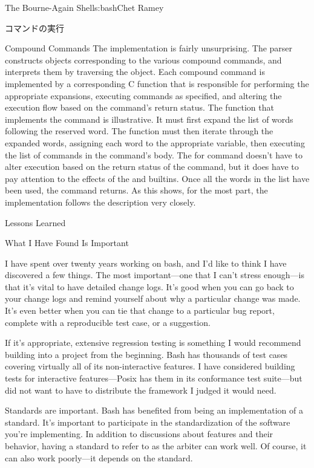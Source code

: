 \begin{aosachapter}{The Bourne-Again Shell}{s:bash}{Chet Ramey}
\begin{aosasect1}{コマンドの実行}
\begin{aosasect2}{Compound Commands}
The implementation is fairly unsurprising.  The parser constructs
objects corresponding to the various compound commands, and interprets
them by traversing the object.  Each compound command is implemented
by a corresponding C function that is responsible for performing the
appropriate expansions, executing commands as specified, and altering
the execution flow based on the command's return status.  The function
that implements the  command is illustrative.  It must first
expand the list of words following the  reserved word.  The
function must then iterate through the expanded words, assigning each
word to the appropriate variable, then executing the list of commands
in the  command's body.  The for command doesn't have to
alter execution based on the return status of the command, but it does
have to pay attention to the effects of the  and
 builtins.  Once all the words in the list have been
used, the  command returns.  As this shows, for the most
part, the implementation follows the description very closely.

\end{aosasect2}

\end{aosasect1}

\begin{aosasect1}{Lessons Learned}

\begin{aosasect2}{What I Have Found Is Important}

I have spent over twenty years working on bash, and I'd like to think
I have discovered a few things.
The most important---one that I can't stress enough---is that it's
vital to have detailed change logs.  It's good when you can go back to
your change logs and remind yourself about why a particular change was
made. It's even better when you can tie that change to a particular
bug report, complete with a reproducible test case, or a suggestion.

If it's appropriate, extensive regression testing is something I would
recommend building into a project from the beginning.  Bash has
thousands of test cases covering virtually all of its non-interactive
features. I have considered building tests for interactive
features---Posix has them in its conformance test suite---but did not
want to have to distribute the framework I judged it would need.

Standards are important.  Bash has benefited from being an
implementation of a standard.  It's important to participate in the
standardization of the software you're implementing.  In addition to
discussions about features and their behavior, having a standard to
refer to as the arbiter can work well.  Of course, it can also work poorly---it
depends on the standard.


\end{aosasect2}
\end{aosasect1}
\end{aosachapter}
